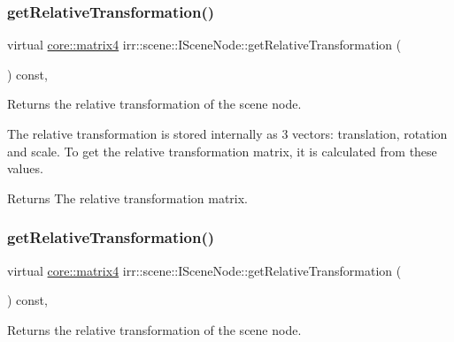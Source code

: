 \subsubsection{\texorpdfstring{get\+Relative\+Transformation()}{getRelativeTransformation()}\hspace{0.1cm}{\footnotesize\ttfamily [1/2]}}
{\footnotesize\ttfamily virtual \hyperlink{namespaceirr_1_1core_a4c9d4e29899535971052810954a14431}{core\+::matrix4} irr\+::scene\+::\+I\+Scene\+Node\+::get\+Relative\+Transformation (\begin{DoxyParamCaption}{ }\end{DoxyParamCaption}) const\hspace{0.3cm}{\ttfamily [inline]}, {\ttfamily [virtual]}}



Returns the relative transformation of the scene node. 

The relative transformation is stored internally as 3 vectors\+: translation, rotation and scale. To get the relative transformation matrix, it is calculated from these values. \begin{DoxyReturn}{Returns}
The relative transformation matrix. 
\end{DoxyReturn}
\mbox{\label{classirr_1_1scene_1_1ISceneNode_ac7c47ec49174315af83cf5f5d24edb24}} 
\subsubsection{\texorpdfstring{get\+Relative\+Transformation()}{getRelativeTransformation()}\hspace{0.1cm}{\footnotesize\ttfamily [2/2]}}
{\footnotesize\ttfamily virtual \hyperlink{namespaceirr_1_1core_a4c9d4e29899535971052810954a14431}{core\+::matrix4} irr\+::scene\+::\+I\+Scene\+Node\+::get\+Relative\+Transformation (\begin{DoxyParamCaption}{ }\end{DoxyParamCaption}) const\hspace{0.3cm}{\ttfamily [inline]}, {\ttfamily [virtual]}}



Returns the relative transformation of the scene node. 

